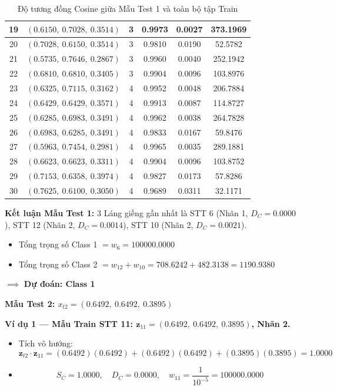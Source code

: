 \documentclass[12pt,a4paper]{article}
\begin{document}
\begin{table}[H]
{\begin{tabular}{|c|c|c|c|c|c|}
19 & $(0.6150,\ 0.7028,\ 0.3514)$ & 3 & 0.9973 & 0.0027 & 373.1969 \\ \hline
20 & $(0.7028,\ 0.6150,\ 0.3514)$ & 3 & 0.9810 & 0.0190 & 52.5782 \\ \hline
21 & $(0.5735,\ 0.7646,\ 0.2867)$ & 3 & 0.9960 & 0.0040 & 252.1942 \\ \hline
22 & $(0.6810,\ 0.6810,\ 0.3405)$ & 3 & 0.9904 & 0.0096 & 103.8976 \\ \hline
23 & $(0.6325,\ 0.7115,\ 0.3162)$ & 4 & 0.9952 & 0.0048 & 206.7884 \\ \hline
24 & $(0.6429,\ 0.6429,\ 0.3571)$ & 4 & 0.9913 & 0.0087 & 114.8727 \\ \hline
25 & $(0.6285,\ 0.6983,\ 0.3491)$ & 4 & 0.9962 & 0.0038 & 264.7828 \\ \hline
26 & $(0.6983,\ 0.6285,\ 0.3491)$ & 4 & 0.9833 & 0.0167 & 59.8476 \\ \hline
27 & $(0.5963,\ 0.7454,\ 0.2981)$ & 4 & 0.9965 & 0.0035 & 289.1881 \\ \hline
28 & $(0.6623,\ 0.6623,\ 0.3311)$ & 4 & 0.9904 & 0.0096 & 103.8752 \\ \hline
29 & $(0.7153,\ 0.6358,\ 0.3974)$ & 4 & 0.9827 & 0.0173 & 57.8286 \\ \hline
30 & $(0.7625,\ 0.6100,\ 0.3050)$ & 4 & 0.9689 & 0.0311 & 32.1171 \\ \hline
\end{tabular}%
}
\caption{Độ tương đồng Cosine giữa Mẫu Test 1 và toàn bộ tập Train}
\end{table}
 
\textbf{Kết luận Mẫu Test 1:} 3 Láng giềng gần nhất là STT 6 (Nhãn 1, $D_C=0.0000$), STT 12 (Nhãn 2, $D_C=0.0014$), STT 10 (Nhãn 2, $D_C=0.0021$).
\begin{itemize}
    \item Tổng trọng số Class 1 $= w_6 = 100000.0000$
    \item Tổng trọng số Class 2 $= w_{12} + w_{10} = 708.6242 + 482.3138 = 1190.9380$
\end{itemize}
$\implies$ \textbf{Dự đoán: Class 1}
 
\vspace{0.5cm}
 
\textbf{Mẫu Test 2: $x_{t2} = (0.6492,\ 0.6492,\ 0.3895)$}
 
\vspace{0.3cm}
\textbf{Ví dụ 1 — Mẫu Train STT 11: $\mathbf{z}_{11} = (0.6492,\ 0.6492,\ 0.3895)$, Nhãn 2.}
\begin{itemize}
    \item Tích vô hướng:
    \[
        \mathbf{z}_{t2} \cdot \mathbf{z}_{11}
        = (0.6492)(0.6492) + (0.6492)(0.6492) + (0.3895)(0.3895) = 1.0000
    \]
    \item
    \[
        S_C = 1.0000, \quad D_C = 0.0000, \quad
        w_{11} = \frac{1}{10^{-5}} = 100000.0000
    \]
\end{itemize}
 
\end{document}
